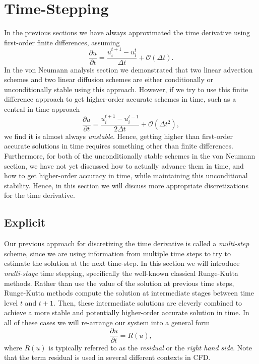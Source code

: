 \chapter{Time-Stepping}
\label{ch:timestepping}
In the previous sections we have always approximated the time derivative using first-order finite differences, assuming
\begin{equation}
	\frac{\partial u}{\partial t} = \frac{u_i^{t+1} - u_{i}^t}{\Delta t} + \mathcal{O}(\Delta t).
\end{equation}
In the von Neumann analysis section we demonstrated that two linear advection schemes and two linear diffusion schemes are either conditionally or unconditionally stable using this approach. However, if we try to use this finite difference approach to get higher-order accurate schemes in time, such as a central in time approach
\begin{equation}
	\frac{\partial u}{\partial t} = \frac{u_i^{t+1} - u_{i}^{t-1}}{2 \Delta t} + \mathcal{O}(\Delta t^2),
\end{equation}
we find it is almost always {\it unstable}. Hence, getting higher than first-order accurate solutions in time requires something other than finite differences. Furthermore, for both of the unconditionally stable schemes in the von Neumann section, we have not yet discussed how to actually advance them in time, and how to get higher-order accuracy in time, while maintaining this unconditional stability. Hence, in this section we will discuss more appropriate discretizations for the time derivative.

\section{Explicit}
Our previous approach for discretizing the time derivative is called a {\it multi-step} scheme, since we are using information from multiple time steps to try to estimate the solution at the next time-step. In this section we will introduce {\it multi-stage} time stepping, specifically the well-known classical Runge-Kutta methods. Rather than use the value of the solution at previous time steps, Runge-Kutta methods compute the solution at intermediate stages between time level $t$ and $t+1$. Then, these intermediate solutions are cleverly combined to achieve a more stable and potentially higher-order accurate solution in time. In all of these cases we will re-arrange our system into a general form
\begin{equation}
	\frac{\partial u}{\partial t} = R(u),
\end{equation}
where $R(u)$ is typically referred to as the {\it residual} or the {\it right hand side}. Note that the term residual is used in several different contexts in CFD.


